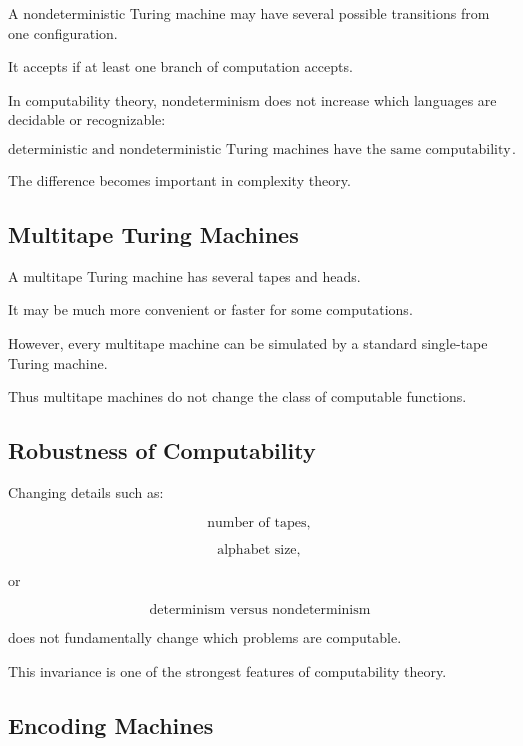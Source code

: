 A nondeterministic Turing machine may have several possible transitions
from one configuration.

It accepts if at least one branch of computation accepts.

In computability theory, nondeterminism does not increase which languages
are decidable or recognizable:

\[
\boxed{
\text{deterministic and nondeterministic Turing machines have the same
computability power}.
}
\]

The difference becomes important in complexity theory.

\subsection{Multitape Turing Machines}
\label{subsec:multitape-turing-machines}

A multitape Turing machine has several tapes and heads.

It may be much more convenient or faster for some computations.

However, every multitape machine can be simulated by a standard single-tape
Turing machine.

Thus multitape machines do not change the class of computable functions.

\subsection{Robustness of Computability}
\label{subsec:robustness-computability}

Changing details such as:

\[
\boxed{
\text{number of tapes},
}
\]

\[
\boxed{
\text{alphabet size},
}
\]

or

\[
\boxed{
\text{determinism versus nondeterminism}
}
\]

does not fundamentally change which problems are computable.

This invariance is one of the strongest features of computability theory.

\subsection{Encoding Machines}
\label{subsec:encoding-machines}

